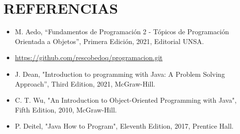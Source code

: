 \documentclass{article}
\begin{document}
	\section{REFERENCIAS}
	\begin{itemize}
		\item M. Aedo, “Fundamentos de Programación 2 - Tópicos de Programación Orientada a Objetos”, Primera Edición, 2021, Editorial UNSA.
		\item \url{https://github.com/rescobedoq/programacion.git}
		\item J. Dean, "Introduction to programming with Java: A Problem Solving Approach”, Third Edition, 2021, McGraw-Hill.
        \item C. T. Wu, "An Introduction to Object-Oriented Programming with Java", Fifth Edition, 2010, McGraw-Hill.
        \item P. Deitel, "Java How to Program", Eleventh Edition, 2017, Prentice Hall.
	\end{itemize}
	
%
%
%
			
\end{document}
